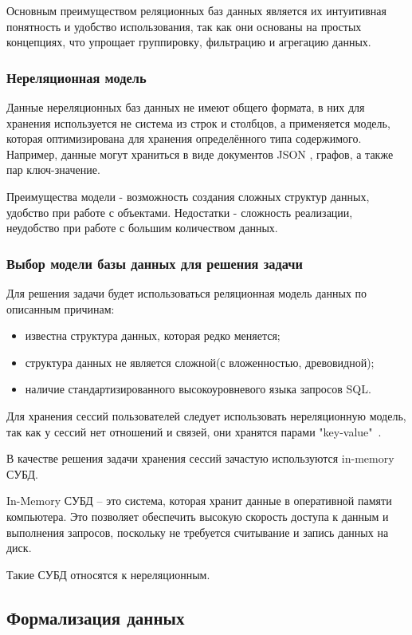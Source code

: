 Основным преимуществом реляционных баз данных является их интуитивная понятность и удобство использования, так как они основаны на простых концепциях, что упрощает группировку, фильтрацию и агрегацию данных.

\subsubsection{Нереляционная модель}
Данные нереляционных баз данных не имеют общего формата, в них для хранения используется не система из строк и столбцов, а применяется модель, которая оптимизирована для хранения определённого типа содержимого. Например, данные могут храниться в виде документов JSON \cite{json}, графов, а также пар ключ-значение.

Преимущества модели - возможность создания сложных структур данных, удобство при работе с объектами. Недостатки - сложность реализации, неудобство при работе с большим количеством данных.

\subsubsection{Выбор модели базы данных для решения задачи}

Для решения задачи будет использоваться реляционная модель данных
по описанным причинам:

\begin{itemize}[leftmargin=1.6\parindent]
	\item известна структура данных, которая редко меняется;
	\item структура данных не является сложной(с вложенностью, древовидной);
	\item наличие стандартизированного высокоуровневого языка запросов SQL.
\end{itemize}

Для хранения сессий пользователей следует использовать нереляционную модель, так как у сессий нет отношений и связей, они хранятся парами "key-value"\ .

В качестве решения задачи хранения сессий зачастую используются in-memory СУБД.

In-Memory СУБД -- это система, которая хранит данные в оперативной памяти компьютера. Это позволяет обеспечить высокую скорость доступа к данным и выполнения запросов, поскольку не требуется считывание и запись данных на диск. 

Такие СУБД относятся к нереляционным. 

\subsection{Формализация данных}
